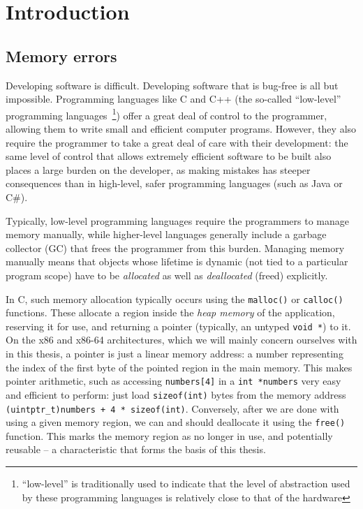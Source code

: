 \chapter{Introduction}
\label{ch:intro}

\section{Memory errors}

Developing software is difficult. Developing software that is bug-free is all but impossible. Programming languages like C and C++ (the so-called ``low-level'' programming languages~\footnote{``low-level'' is traditionally used to indicate that the level of abstraction used by these  programming languages is relatively close to that of the hardware}) offer a great deal of control to the programmer, allowing them to write small and efficient computer programs. However, they also require the programmer to take a great deal of care with their development: the same level of control that allows extremely efficient software to be built also places a large burden on the developer, as making mistakes has steeper consequences than in high-level, safer programming languages (such as Java or C\#).

Typically, low-level programming languages require the programmers to manage memory manually, while higher-level languages generally include a garbage collector (GC) that frees the programmer from this burden. Managing memory manually means that objects whose lifetime is dynamic (not tied to a particular program scope) have to be \emph{allocated} as well as \emph{deallocated} (freed) explicitly.

In C, such memory allocation typically occurs using the \lstinline!malloc()! or \lstinline!calloc()! functions. These allocate a region inside the \emph{heap memory} of the application, reserving it for use, and returning a pointer (typically, an untyped \lstinline!void *!) to it. On the x86 and x86-64 architectures, which we will mainly concern ourselves with in this thesis, a pointer is just a linear memory address: a number representing the index of the first byte of the pointed region in the main memory. This makes pointer arithmetic, such as accessing \lstinline!numbers[4]! in a \lstinline!int *numbers! very easy and efficient to perform: just load \lstinline!sizeof(int)! bytes from the memory address \lstinline!(uintptr_t)numbers + 4 * sizeof(int)!. Conversely, after we are done with using a given memory region, we can and should deallocate it using the \lstinline!free()! function. This marks the memory region as no longer in use, and potentially reusable -- a characteristic that forms the basis of this thesis.

